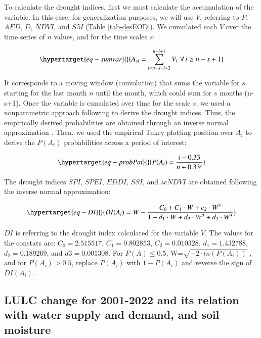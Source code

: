 \documentclass[
  authoryear,
  preprint,
  3p,
  onecolumn]{elsarticle}
\begin{document}
To calculate the drought indices, first we must calculate the
accumulation of the variable. In this case, for generalization purposes,
we will use \(V\), referring to \(P\), \(AED\), \(D\), \(NDVI\), and
\(SM\) (Table \ref{tab-desEOD}). We cumulated each \(V\) over the time
series of \(n\) values, and for the time scales \(s\):

\begin{equation}\protect\hypertarget{eq-sumvar}{}{A_{si} = \sum_{i=n-s-i+2}^{n-i+1} V_i\,\, \forall\, i\geq n-s+1  }\label{eq-sumvar}\end{equation}

It corresponds to a moving window (convolution) that sums the variable
for \(s\) starting for the last month \(n\) until the month, which could
sum for \(s\) months (n-s+1). Once the variable is cumulated over time
for the scale \(s\), we used a nonparametric approach following
\citet{Hobbins2016} to derive the drought indices. Thus, the empirically
derived probabilities are obtained through an inverse normal
approximation \citep{Abramowitz1968}. Then, we used the empirical Tukey
plotting position \citep{Wilks2011} over \(A_i\) to derive the
\(P(A_i)\) probabilities across a period of interest:

\begin{equation}\protect\hypertarget{eq-probPai}{}{P(A_i) = \frac{i-0.33}{n+0.33'}}\label{eq-probPai}\end{equation}

The drought indices \(SPI\), \(SPEI\), \(EDDI\), \(SSI\), and \(zcNDVI\)
are obtained following the inverse normal approximation:

\begin{equation}\protect\hypertarget{eq-DI}{}{DI(A_i) = W - \frac{C_0+C_1\cdot W + c_2 \cdot W^2}{1+d_1\cdot W +d_2\cdot W^2 +d_3\cdot W^3}}\label{eq-DI}\end{equation}

\(DI\) is referring to the drought index calculated for the variable
\(V\). The values for the constats are: \(C_0 = 2.515517\),
\(C_1 = 0.802853\), \(C_2 = 0.010328\), \(d_1 = 1.432788\),
\(d_2 = 0.189269\), and \(d3 = 0.001308\). For \(P(A) \leq 0.5\),
W=\(\sqrt{-2\cdot ln(P(A_i))}\) , and for \(P(A_i) > 0.5\), replace
\(P(A_i)\) with \(1-P(A_i)\) and reverse the sign of \(DI(A_i)\).

\hypertarget{sec-methods_lulc}{%
\subsection{LULC change for 2001-2022 and its relation with water supply
and demand, and soil moisture}\label{sec-methods_lulc}}
\end{document}
